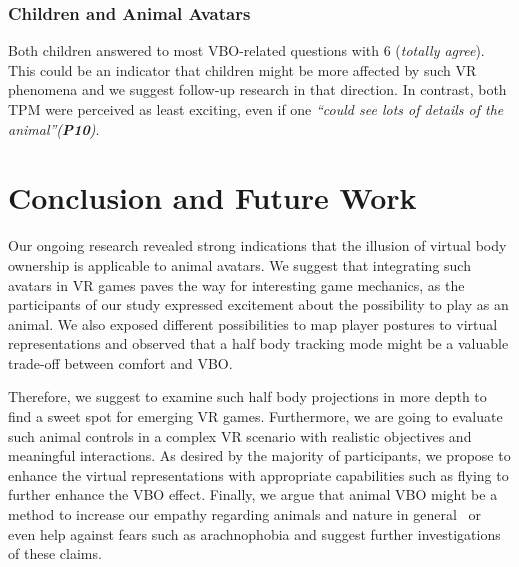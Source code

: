 \documentclass{sigchi-ext}
\begin{document}


\subsubsection{Children and Animal Avatars}

Both children answered to most VBO-related questions with 6 (\textit{totally agree}). This could be an indicator that children might be more affected by such VR phenomena and we suggest follow-up research in that direction. In contrast, both TPM were perceived as least exciting, even if one \textit{``could see lots of details of the animal''(\textbf{P10})}.


\section{Conclusion and Future Work}


Our ongoing research revealed strong indications that the illusion of virtual body ownership is applicable to animal avatars. We suggest that integrating such avatars in VR games paves the way for interesting game mechanics, as the participants of our study expressed excitement about the possibility to play as an animal. We also exposed different possibilities to map player postures to virtual representations and observed that a half body tracking mode might be a valuable trade-off between comfort and VBO.

Therefore, we suggest to examine such half body projections in more depth to find a sweet spot for emerging VR games. Furthermore, we are going to evaluate such animal controls in a complex VR scenario with realistic objectives and meaningful interactions. As desired by the majority of participants, we propose to enhance the virtual representations with appropriate capabilities such as flying to further enhance the VBO effect. Finally, we argue that animal VBO might be a method to increase our empathy regarding animals and nature in general~\cite{ahn2016experiencing} or even help against fears such as 
arachnophobia and suggest further investigations of these claims.


\balance{} 



\end{document}
